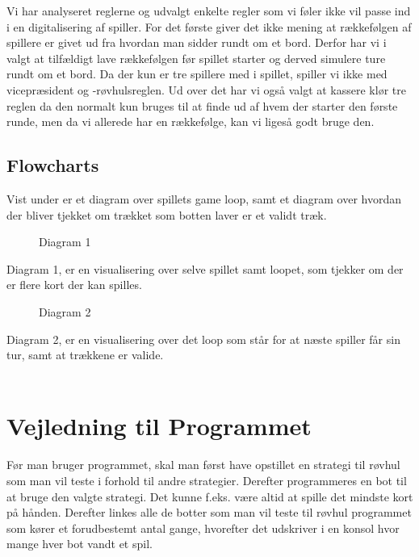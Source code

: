 \documentclass[a4paper, 12pt]{article}
\begin{document}
\begin{multicols}{2}
Vi har analyseret reglerne og udvalgt enkelte regler som vi føler ikke vil passe ind i en digitalisering af spiller. For det første giver det ikke mening at rækkefølgen af spillere er givet ud fra hvordan man sidder rundt om et bord. Derfor har vi i valgt at tilfældigt lave rækkefølgen før spillet starter og derved simulere ture rundt om et bord. Da der kun er tre spillere med i spillet, spiller vi ikke med vicepræsident og -røvhulsreglen.
Ud over det har vi også valgt at kassere klør tre reglen da den normalt kun bruges til at finde ud af hvem der starter den første runde, men da vi allerede har en rækkefølge, kan vi ligeså godt bruge den.
\vfill

\subsection{Flowcharts}
Vist under er et diagram over spillets game loop, samt et diagram over hvordan der bliver tjekket om trækket som botten laver er et validt træk.
\begin{figure}[H]
    \centering
    \resizebox{.5\linewidth}{!}{}
    \caption{Diagram 1}
\end{figure}

Diagram 1, er en visualisering over selve spillet samt loopet, som tjekker om der er flere kort der kan spilles.
\bigbreak

\begin{figure}[H]
    \centering
    \resizebox{.5\linewidth}{!}{}
    \caption{Diagram 2}
\end{figure}
\pagebreak
Diagram 2, er en visualisering over det loop som står for at næste spiller får sin tur, samt at trækkene er valide.
\\
\\

\section{Vejledning til Programmet}

Før man bruger programmet, skal man først have opstillet en strategi til røvhul som man vil teste i forhold til andre strategier. Derefter programmeres en bot til at bruge den valgte strategi. Det kunne f.eks. være altid at spille det mindste kort på hånden. Derefter linkes alle de botter som man vil teste til røvhul programmet som kører et forudbestemt antal gange, hvorefter det udskriver i en konsol hvor mange hver bot vandt et spil.


\end{multicols}
\end{document}
